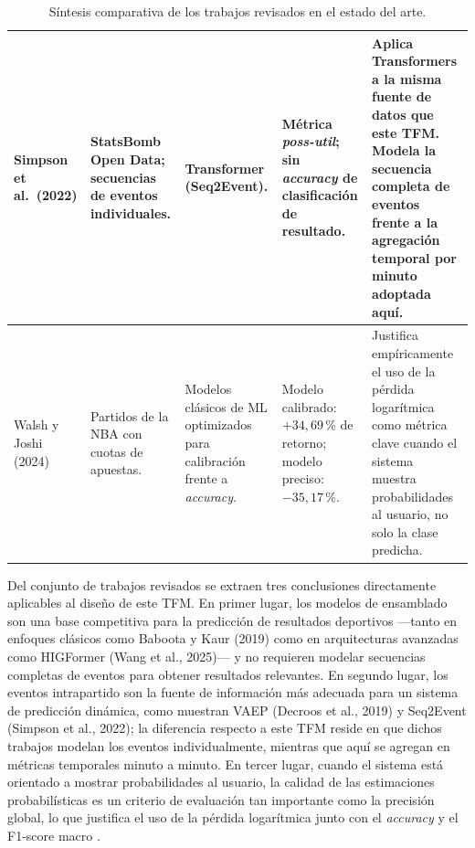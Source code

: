 \begin{table}[H]
\begin{tabularx}{\textwidth}{|p{2.4cm}|p{2.5cm}|p{2.6cm}|p{2.2cm}|X|}
        Simpson et al.\ (2022)                                                           &
        StatsBomb Open Data; secuencias de eventos individuales.                         &
        Transformer (Seq2Event).                                                         &
        Métrica \textit{poss-util}; sin \textit{accuracy} de clasificación de resultado. &
        Aplica Transformers a la misma fuente de datos que este TFM. Modela la secuencia completa de eventos frente a la agregación temporal por minuto adoptada aquí.                                                 \\
        \hline

        Walsh y Joshi (2024)                                                             &
        Partidos de la NBA con cuotas de apuestas.                                       &
        Modelos clásicos de ML optimizados para calibración frente a \textit{accuracy}.  &
        Modelo calibrado: $+34{,}69$\,\% de retorno; modelo preciso: $-35{,}17$\,\%.     &
        Justifica empíricamente el uso de la pérdida logarítmica como métrica clave cuando el sistema muestra probabilidades al usuario, no solo la clase predicha.                                                    \\
        \hline
    \end{tabularx}
    \caption{Síntesis comparativa de los trabajos revisados en el estado del arte.}
    \label{tab:sintesis_global}
\end{table}

Del conjunto de trabajos revisados se extraen tres conclusiones directamente aplicables al diseño de este TFM. En primer lugar, los modelos de ensamblado son una base competitiva para la predicción de resultados deportivos —tanto en enfoques clásicos como Baboota y Kaur (2019) como en arquitecturas avanzadas como HIGFormer (Wang et al., 2025)— y no requieren modelar secuencias completas de eventos para obtener resultados relevantes. En segundo lugar, los eventos intrapartido son la fuente de información más adecuada para un sistema de predicción dinámica, como muestran VAEP (Decroos et al., 2019) y Seq2Event (Simpson et al., 2022); la diferencia respecto a este TFM reside en que dichos trabajos modelan los eventos individualmente, mientras que aquí se agregan en métricas temporales minuto a minuto. En tercer lugar, cuando el sistema está orientado a mostrar probabilidades al usuario, la calidad de las estimaciones probabilísticas es un criterio de evaluación tan importante como la precisión global, lo que justifica el uso de la pérdida logarítmica junto con el \textit{accuracy} y el F1-score macro \citep{walsh2024calibration}.

